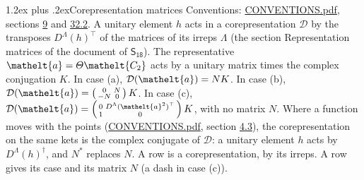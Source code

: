 \documentclass[10pt,a4paper]{article}
\makeatletter
\renewcommand\section{\@startsection{section}{1}{\z@}{-3ex plus -1ex minus -.2ex}%
  {1.2ex plus .2ex}{\normalfont\large\sffamily\bfseries\color{parttitle}}}
\numberwithin{equation}{section}
\newcommand{\eltfont}[1]{{\let\sigma\eltsigma\mathelt{#1}}}
\newcommand{\grp}[1]{\mathsf{#1}}
\newcommand{\elt}[1]{\eltfont{#1}}
\makeatother
\begin{document}
\section{Corepresentation matrices}\label{s:corep_matrices}
Conventions: \href{../../CONVENTIONS.pdf}{CONVENTIONS.pdf}, sections \href{../../../rotation/CONVENTIONS.pdf\#conv.9}{9} and \href{../../CONVENTIONS.pdf\#conv.32.2}{32.2}.
A unitary element $h$ acts in a corepresentation $\mathcal{D}$ by the transposes $D^{\Lambda}(h)^{\top}$ of the matrices of its irreps $\Lambda$ (the section Representation matrices of the document of \href{../../../rotation/data/pdf/S18.pdf}{$\grp{S_{18}}$}). The representative $\elt{a} = \varTheta\elt{C_{2}}$ acts by a unitary matrix times the complex conjugation $K$.
In case (a), $\mathcal{D}(\elt{a}) = NK$. In case (b), $\mathcal{D}(\elt{a}) = \left(\begin{smallmatrix} 0 & N \\ -N & 0 \end{smallmatrix}\right) K$. In case (c), $\mathcal{D}(\elt{a}) = \left(\begin{smallmatrix} 0 & D^{\Lambda}(\elt{a}^2)^{\top} \\ 1 & 0 \end{smallmatrix}\right) K$, with no matrix $N$.
Where a function moves with the points (\href{../../CONVENTIONS.pdf}{CONVENTIONS.pdf}, section \href{../../../rotation/CONVENTIONS.pdf\#conv.4.3}{4.3}), the corepresentation on the same kets is the complex conjugate of $\mathcal{D}$: a unitary element $h$ acts by $D^{\Lambda}(h)^{\dagger}$, and $N^{*}$ replaces $N$.
A row is a corepresentation, by its irreps. A row gives its case and its matrix $N$ (a dash in case (c)).
\end{document}
